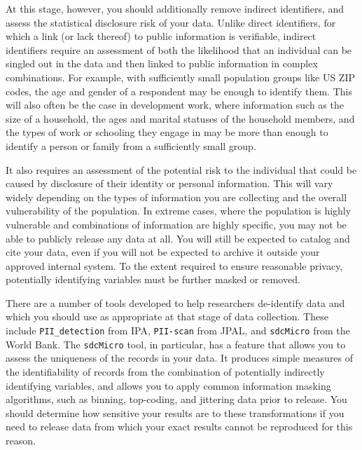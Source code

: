 At this stage, however, you should additionally remove
indirect identifiers, and assess the statistical disclosure risk of your data.
Unlike direct identifiers, for which a link (or lack thereof) to public information is verifiable,
indirect identifiers require an assessment of both the likelihood
that an individual can be singled out in the data
and then linked to public information in complex combinations.
For example, with sufficiently small population groups like US ZIP codes,
the age and gender of a respondent may be enough to identify them.
This will also often be the case in development work,
where information such as the size of a household,
the ages and marital statuses of the household members,
and the types of work or schooling they engage in
may be more than enough to identify a person or family
from a sufficiently small group.

It also requires an assessment of the potential risk to the individual
that could be caused by disclosure of their identity or personal information.
This will vary widely depending on the types of information
you are collecting and the overall vulnerability of the population.
In extreme cases, where the population is highly vulnerable
and combinations of information are highly specific,
you may not be able to publicly release any data at all.
You will still be expected to catalog and cite your data,
even if you will not be expected to archive it outside your approved internal system.
To the extent required to ensure reasonable privacy,
potentially identifying variables must be further masked or removed.

There are a number of tools developed to help researchers de-identify data
and which you should use as appropriate at that stage of data collection.
These include \texttt{PII\_detection}
from IPA,
\texttt{PII-scan}
from JPAL,
and \texttt{sdcMicro}
from the World Bank.
The \texttt{sdcMicro} tool, in particular, has a feature
that allows you to assess the uniqueness of the records in your data.
It produces simple measures of the identifiability of records from
the combination of potentially indirectly identifying variables,
and allows you to apply common information masking algorithms,
such as binning, top-coding, and jittering data prior to release.
You should determine how sensitive your results are to these transformations
if you need to release data from which your exact results
cannot be reproduced for this reason.

